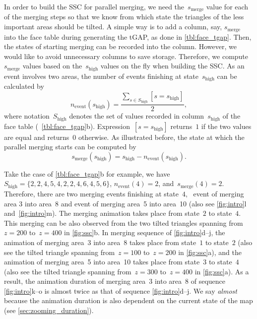 \documentclass[]{interact}
\begin{document}
In order to build the SSC for parallel merging,
we need the~$s_\mathrm{merge}$ value for each of the merging steps
so that we know from which state 
the triangles of the less important areas should be tilted.
A simple way is to add a column, say, $s_\mathrm{merge}$
into the face table during generating the tGAP, 
as done in \tabl\ref{tbl:face_tgap}.
Then, the states of starting merging can be recorded into the column.
However, we would like to avoid unnecessary columns to save storage.
Therefore, we compute~$s_\mathrm{merge}$ values 
based on the~$s_\mathrm{high}$ values
on the fly when building the SSC.
As an event involves two areas,
the number of events finishing at state~$s_\mathrm{high}$ can be calculated by
\begin{equation*}
\label{eq:n_event_state}
n_\mathrm{event} (s_\mathrm{high}) = 
\frac{\sum\limits_{s \in S_\mathrm{high}} [s=s_\mathrm{high}]}{2},
\end{equation*}
where notation~$S_\mathrm{high}$ denotes the set of values
recorded in column~$s_\mathrm{high}$ of the face table
(\eg~\tabl\ref{tbl:face_tgap}b).
Expression~$[s=s_\mathrm{high}]$ returns~$1$ if the two values are equal 
and returns~$0$ otherwise.
As illustrated before, the state at which the parallel merging starts 
can be computed by
\begin{equation*}
\label{eq:s_merge_state}
s_\mathrm{merge} (s_\mathrm{high}) = s_\mathrm{high} - n_\mathrm{event} (s_\mathrm{high}).
\end{equation*}



Take the case of \tabl\ref{tbl:face_tgap}b for example,
we have~$S_\mathrm{high} = \{2, 2, 4, 5, 4, 2, 2, 4, 6, 4, 5, 6\}$, 
$n_\mathrm{event} (4) = 2$, and~$s_\mathrm{merge} (4) = 2$.
Therefore, there are two merging events finishing at state~$4$,
\ie~event of merging area 3 into area~8 and 
event of merging area~5 into area~10 
(also see \figs\ref{fig:intro}l and~\ref{fig:intro}m).
The merging animation takes place from state~$2$ to state~$4$.
This merging can be also observed from 
the two tilted triangles spanning from~$z = 200$ to~$z = 400$ 
in \fig\ref{fig:ssc}b.
In merging sequence of \figs\ref{fig:intro}d--j, 
the animation of merging area~3 into area~8 
takes place from state~$1$ to state~$2$
(also see the tilted triangle spanning from~$z = 100$ to~$z = 200$ 
in \fig\ref{fig:ssc}a), and 
the animation of merging area~5 into area~10
takes place from state~$3$ to state~$4$
(also see the tilted triangle spanning from~$z = 300$ to~$z = 400$ 
in \fig\ref{fig:ssc}a).
As a result, the animation duration of merging area~3 into area~8 of 
sequence \figs\ref{fig:intro}k--o
is almost twice as that of sequence \figs\ref{fig:intro}d--j.
We say \emph{almost} because the animation duration is also dependent on 
the current state of the map
(see \sect\ref{sec:zooming_duration}).
\end{document}
